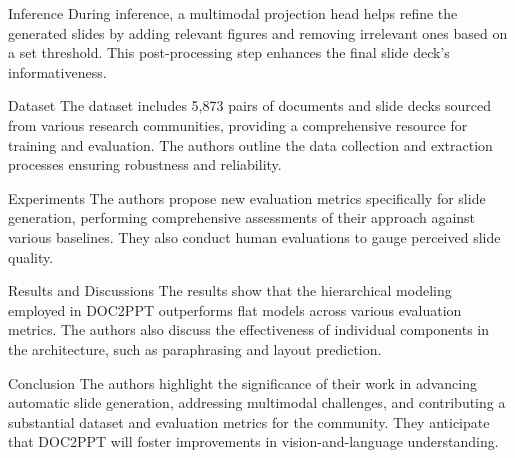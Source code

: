 \documentclass{beamer}
\begin{document}
\begin{frame}{Inference}
    During inference, a multimodal projection head helps refine the generated slides by adding relevant figures and removing irrelevant ones based on a set threshold. This post-processing step enhances the final slide deck's informativeness.
\end{frame}

\begin{frame}{Dataset}
    The dataset includes 5,873 pairs of documents and slide decks sourced from various research communities, providing a comprehensive resource for training and evaluation. The authors outline the data collection and extraction processes ensuring robustness and reliability.
\end{frame}

\begin{frame}{Experiments}
    The authors propose new evaluation metrics specifically for slide generation, performing comprehensive assessments of their approach against various baselines. They also conduct human evaluations to gauge perceived slide quality.
\end{frame}

\begin{frame}{Results and Discussions}
    The results show that the hierarchical modeling employed in DOC2PPT outperforms flat models across various evaluation metrics. The authors also discuss the effectiveness of individual components in the architecture, such as paraphrasing and layout prediction.
\end{frame}

\begin{frame}{Conclusion}
    The authors highlight the significance of their work in advancing automatic slide generation, addressing multimodal challenges, and contributing a substantial dataset and evaluation metrics for the community. They anticipate that DOC2PPT will foster improvements in vision-and-language understanding.
\end{frame}
\end{document}
